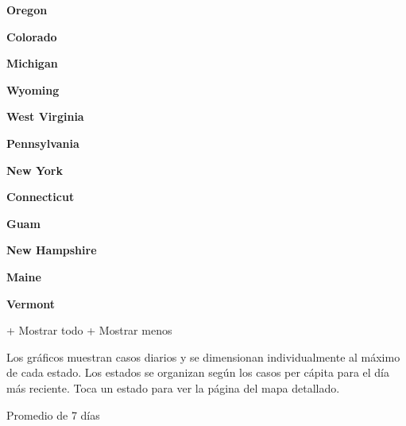\textbf{Oregon}

\href{https://www.nytimes3xbfgragh.onion/interactive/2020/us/colorado-coronavirus-cases.html}{}

\textbf{Colorado}

\href{https://www.nytimes3xbfgragh.onion/interactive/2020/us/michigan-coronavirus-cases.html}{}

\textbf{Michigan}

\href{https://www.nytimes3xbfgragh.onion/interactive/2020/us/wyoming-coronavirus-cases.html}{}

\textbf{Wyoming}

\href{https://www.nytimes3xbfgragh.onion/interactive/2020/us/west-virginia-coronavirus-cases.html}{}

\textbf{West Virginia}

\href{https://www.nytimes3xbfgragh.onion/interactive/2020/us/pennsylvania-coronavirus-cases.html}{}

\textbf{Pennsylvania}

\href{https://www.nytimes3xbfgragh.onion/interactive/2020/us/new-york-coronavirus-cases.html}{}

\textbf{New York}

\href{https://www.nytimes3xbfgragh.onion/interactive/2020/us/connecticut-coronavirus-cases.html}{}

\textbf{Connecticut}

\textbf{Guam}

\href{https://www.nytimes3xbfgragh.onion/interactive/2020/us/new-hampshire-coronavirus-cases.html}{}

\textbf{New Hampshire}

\href{https://www.nytimes3xbfgragh.onion/interactive/2020/us/maine-coronavirus-cases.html}{}

\textbf{Maine}

\href{https://www.nytimes3xbfgragh.onion/interactive/2020/us/vermont-coronavirus-cases.html}{}

\textbf{Vermont}

+ Mostrar todo + Mostrar menos

Los gráficos muestran casos diarios y se dimensionan individualmente al
máximo de cada estado. Los estados se organizan según los casos per
cápita para el día más reciente. Toca un estado para ver la página del
mapa detallado.

\href{https://www.nytimes3xbfgragh.onion/interactive/2020/us/louisiana-coronavirus-cases.html}{}

Promedio de 7 días

